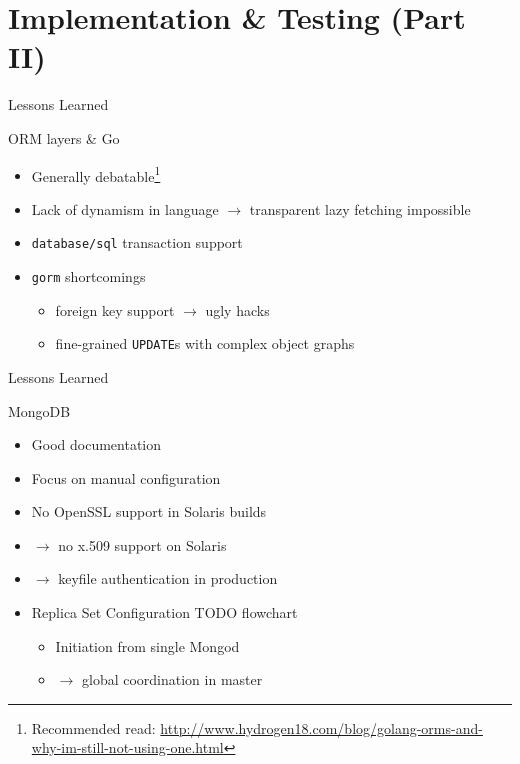 \documentclass[11pt,aspectratio=169]{beamer}
\begin{document}
    \section{Implementation \& Testing (Part II)}
   
    \begin{frame}{Lessons Learned}
     
      ORM layers \& Go
            
      \pause
      \begin{itemize}
        \item<+-> Generally debatable\footnote{\tiny Recommended read: \url{http://www.hydrogen18.com/blog/golang-orms-and-why-im-still-not-using-one.html}}
        \item<+-> Lack of dynamism in language $\rightarrow$ transparent lazy fetching impossible
        \item<+-> \texttt{database/sql} transaction support 
        \item<+-> \texttt{gorm} shortcomings
          \begin{itemize}
            \item<+-> foreign key support $\rightarrow$ ugly hacks  
            \item<+-> fine-grained \texttt{UPDATE}s with complex object graphs
          \end{itemize}
      \end{itemize}

    \end{frame}
    \begin{frame}{Lessons Learned}

      MongoDB \pause \shrug \pause

      \begin{itemize}
       \item<+-> Good documentation
       \item<+-> Focus on manual configuration    
       \item<+-> No OpenSSL support in Solaris builds
       \item<+-> $\rightarrow$ no x.509 support on Solaris
       \item<+-> $\rightarrow$ keyfile authentication in production
       \item<+-> Replica Set Configuration TODO flowchart
         \begin{itemize}
           \item<+-> Initiation from single Mongod
           \item<+-> $\rightarrow$ global coordination in master
         \end{itemize}
      \end{itemize}

    \end{frame}
\end{document}
